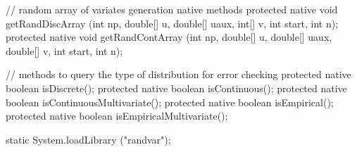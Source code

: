 \begin{code}
\begin{hide}
{   // random array of variates generation native methods
   protected native void getRandDiscArray (int np, double[] u, double[] uaux,
        int[] v, int start, int n);
   protected native void getRandContArray (int np, double[] u, double[] uaux,
        double[] v, int start, int n);

   // methods to query the type of distribution for error checking
   protected native boolean isDiscrete();
   protected native boolean isContinuous();
   protected native boolean isContinuousMultivariate();
   protected native boolean isEmpirical();
   protected native boolean isEmpiricalMultivariate();

   static {
      System.loadLibrary ("randvar");
   }
}\end{hide}\end{code}
